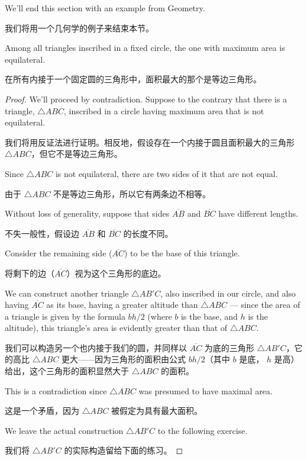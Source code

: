 We'll end this section with an example from Geometry.

我们将用一个几何学的例子来结束本节。

\begin{thm}
Among all triangles inscribed in a fixed circle, the one with maximum
area is equilateral.

在所有内接于一个固定圆的三角形中，面积最大的那个是等边三角形。
\end{thm}

\begin{proof} 
We'll proceed by contradiction.  Suppose to the contrary that there is a 
triangle, $\triangle ABC$, inscribed in a circle having maximum area that 
is not equilateral.

我们将用反证法进行证明。相反地，假设存在一个内接于圆且面积最大的三角形 $\triangle ABC$，但它不是等边三角形。

Since $\triangle ABC$ is not equilateral, there are 
two sides of it that are not equal.

由于 $\triangle ABC$ 不是等边三角形，所以它有两条边不相等。

Without loss of generality, suppose that
sides $\overline{AB}$ and $\overline{BC}$ have different lengths.

不失一般性，假设边 $\overline{AB}$ 和 $\overline{BC}$ 的长度不同。

Consider
the remaining side ($\overline{AC}$) to be the base of this triangle.

将剩下的边（$\overline{AC}$）视为这个三角形的底边。

We can construct another triangle $\triangle AB'C$, also inscribed in our circle, and also 
having $\overline{AC}$ as its base, having a greater altitude than
$\triangle ABC$ --- since the area of a triangle is given by
the formula $bh/2$ (where $b$ is the base, and $h$ is the altitude), 
this triangle's area is evidently greater than that of $\triangle ABC$.

我们可以构造另一个也内接于我们的圆，并同样以 $\overline{AC}$ 为底的三角形 $\triangle AB'C$，它的高比 $\triangle ABC$ 更大——因为三角形的面积由公式 $bh/2$（其中 $b$ 是底， $h$ 是高）给出，这个三角形的面积显然大于 $\triangle ABC$ 的面积。

This is a contradiction since $\triangle ABC$ was presumed to have 
maximal area.

这是一个矛盾，因为 $\triangle ABC$ 被假定为具有最大面积。

We leave the actual construction $\triangle AB'C$ to the following exercise.

我们将 $\triangle AB'C$ 的实际构造留给下面的练习。
\end{proof}

